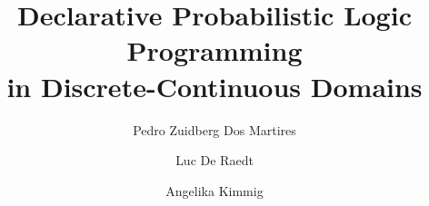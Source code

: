 \documentclass[final]{elsarticle}
\numberwithin{equation}{section}
\begin{document}
\setcounter{page}{1}
\renewcommand{\thepage}{\roman{page}}

\setcounter{section}{0}
\renewcommand{\thesection}{R\arabic{section}}

\renewcommand{\theequation}{R\arabic{section}.\arabic{equation}}

% 

\setcounter{page}{1}
\renewcommand{\thepage}{\arabic{page}}

\setcounter{section}{0}
\renewcommand{\thesection}{\arabic{section}}
\renewcommand{\theequation}{\arabic{section}.\arabic{equation}}




\begin{frontmatter}

    \title{Declarative Probabilistic Logic Programming\\in Discrete-Continuous Domains}

    \author[orebro]{Pedro Zuidberg Dos Martires}
    \author[orebro,kuleuven,leuvenai]{Luc De Raedt}
    \author[kuleuven,leuvenai]{Angelika Kimmig}


    \address[orebro]{Centre for Applied Autonomous Sensor Systems, Örebro University, Sweden}
    \address[kuleuven]{Department of Computer Science, KU Leuven, Belgium}
    \address[leuvenai]{Leuven.AI, Belgium}






\end{frontmatter}
\end{document}
